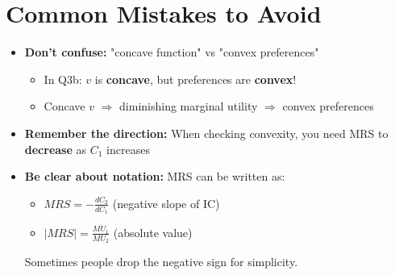 \documentclass[12pt]{article}
\begin{document}
\section*{Common Mistakes to Avoid}

\begin{itemize}[leftmargin=*]
\item \textbf{Don't confuse:} "concave function" vs "convex preferences"
\begin{itemize}
\item In Q3b: $v$ is \textbf{concave}, but preferences are \textbf{convex}!
\item Concave $v$ $\Rightarrow$ diminishing marginal utility $\Rightarrow$ convex preferences
\end{itemize}

\item \textbf{Remember the direction:} When checking convexity, you need MRS to \textbf{decrease} as $C_1$ increases

\item \textbf{Be clear about notation:} MRS can be written as:
\begin{itemize}
\item $MRS = -\frac{dC_2}{dC_1}$ (negative slope of IC)
\item $|MRS| = \frac{MU_1}{MU_2}$ (absolute value)
\end{itemize}
Sometimes people drop the negative sign for simplicity.
\end{itemize}
\end{document}

